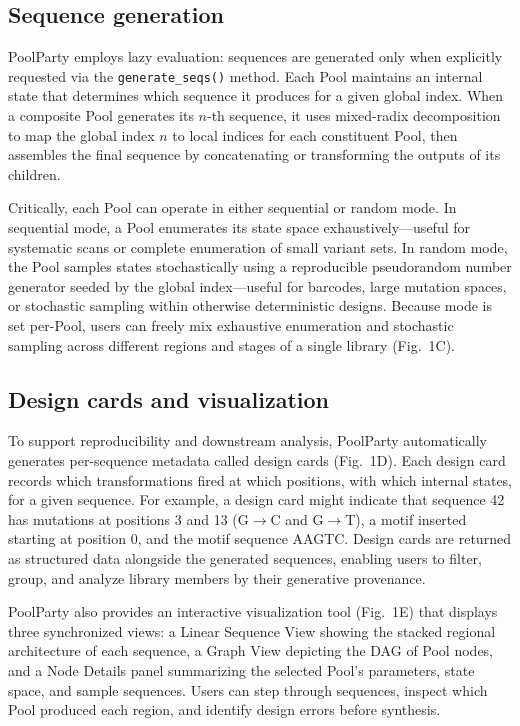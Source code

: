 \documentclass[unnumsec,webpdf,modern,large]{mam-authoring-template}%
\theoremstyle{thmstyleone}%
\theoremstyle{thmstyletwo}%
\theoremstyle{thmstylethree}%
\begin{document}
\subsection{Sequence generation}

PoolParty employs lazy evaluation: sequences are generated only when explicitly requested via the \texttt{generate\_seqs()} method. Each Pool maintains an internal state that determines which sequence it produces for a given global index. When a composite Pool generates its $n$-th sequence, it uses mixed-radix decomposition to map the global index $n$ to local indices for each constituent Pool, then assembles the final sequence by concatenating or transforming the outputs of its children.

Critically, each Pool can operate in either sequential or random mode. In sequential mode, a Pool enumerates its state space exhaustively---useful for systematic scans or complete enumeration of small variant sets. In random mode, the Pool samples states stochastically using a reproducible pseudorandom number generator seeded by the global index---useful for barcodes, large mutation spaces, or stochastic sampling within otherwise deterministic designs. Because mode is set per-Pool, users can freely mix exhaustive enumeration and stochastic sampling across different regions and stages of a single library (Fig.~1C).

\subsection{Design cards and visualization}

To support reproducibility and downstream analysis, PoolParty automatically generates per-sequence metadata called design cards (Fig.~1D). Each design card records which transformations fired at which positions, with which internal states, for a given sequence. For example, a design card might indicate that sequence 42 has mutations at positions 3 and 13 (G$\rightarrow$C and G$\rightarrow$T), a motif inserted starting at position 0, and the motif sequence AAGTC. Design cards are returned as structured data alongside the generated sequences, enabling users to filter, group, and analyze library members by their generative provenance.

PoolParty also provides an interactive visualization tool (Fig.~1E) that displays three synchronized views: a Linear Sequence View showing the stacked regional architecture of each sequence, a Graph View depicting the DAG of Pool nodes, and a Node Details panel summarizing the selected Pool's parameters, state space, and sample sequences. Users can step through sequences, inspect which Pool produced each region, and identify design errors before synthesis.
\end{document}
